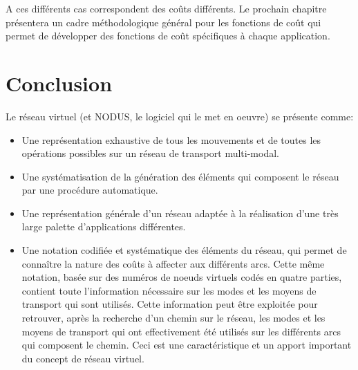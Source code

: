 A ces différents cas correspondent des coûts différents. Le prochain
chapitre présentera un cadre méthodologique général pour
les fonctions de coût qui permet de développer des fonctions de
coût spécifiques à chaque application.


\section{Conclusion}



Le réseau virtuel (et NODUS, le logiciel qui le met en oeuvre) se
présente comme:


\begin{itemize}
\item Une représentation exhaustive de tous les mouvements et de toutes les
opérations possibles sur un réseau de transport multi-modal.
\item Une systématisation de la génération des éléments qui composent
le réseau par une procédure automatique.
\item Une représentation générale d'un réseau adaptée à la réalisation d'une
très large palette d'applications différentes.
\item Une notation codifiée et systématique des éléments du réseau, qui permet
de connaître la nature des coûts à affecter aux différents arcs.
Cette même notation, basée sur des numéros de noeuds virtuels codés
en quatre parties, contient toute l'information nécessaire sur les
modes et les moyens de transport qui sont utilisés. Cette
information peut être exploitée pour retrouver, après la recherche
d'un chemin sur le réseau, les modes et les moyens de transport qui
ont effectivement été utilisés sur les différents arcs qui
composent le chemin. Ceci est une caractéristique et un apport
important du concept de réseau virtuel.
\end{itemize}


